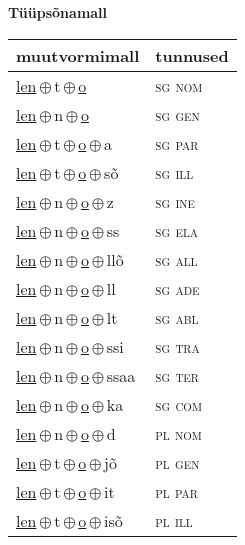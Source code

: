 

\vspace{3.5em}
\noindent \begin{minipage}{\textwidth}
\noindent \textbf{Tüüpsõnamall \,}\\

\begin{sideways}
\begin{tabular}{l l}
muutvormimall & tunnused \\
\hline
\underline{len}\,$\oplus$\,t\,$\oplus$\,\underline{o} & \textsc{ sg nom } \\
\underline{len}\,$\oplus$\,n\,$\oplus$\,\underline{o} & \textsc{ sg gen } \\
\underline{len}\,$\oplus$\,t\,$\oplus$\,\underline{o}\,$\oplus$\,a & \textsc{ sg par } \\
\underline{len}\,$\oplus$\,t\,$\oplus$\,\underline{o}\,$\oplus$\,sõ & \textsc{ sg ill } \\
\underline{len}\,$\oplus$\,n\,$\oplus$\,\underline{o}\,$\oplus$\,z & \textsc{ sg ine } \\
\underline{len}\,$\oplus$\,n\,$\oplus$\,\underline{o}\,$\oplus$\,ss & \textsc{ sg ela } \\
\underline{len}\,$\oplus$\,n\,$\oplus$\,\underline{o}\,$\oplus$\,llõ & \textsc{ sg all } \\
\underline{len}\,$\oplus$\,n\,$\oplus$\,\underline{o}\,$\oplus$\,ll & \textsc{ sg ade } \\
\underline{len}\,$\oplus$\,n\,$\oplus$\,\underline{o}\,$\oplus$\,lt & \textsc{ sg abl } \\
\underline{len}\,$\oplus$\,n\,$\oplus$\,\underline{o}\,$\oplus$\,ssi & \textsc{ sg tra } \\
\underline{len}\,$\oplus$\,n\,$\oplus$\,\underline{o}\,$\oplus$\,ssaa & \textsc{ sg ter } \\
\underline{len}\,$\oplus$\,n\,$\oplus$\,\underline{o}\,$\oplus$\,ka & \textsc{ sg com } \\
\underline{len}\,$\oplus$\,n\,$\oplus$\,\underline{o}\,$\oplus$\,d & \textsc{ pl nom } \\
\underline{len}\,$\oplus$\,t\,$\oplus$\,\underline{o}\,$\oplus$\,jõ & \textsc{ pl gen } \\
\underline{len}\,$\oplus$\,t\,$\oplus$\,\underline{o}\,$\oplus$\,it & \textsc{ pl par } \\
\underline{len}\,$\oplus$\,t\,$\oplus$\,\underline{o}\,$\oplus$\,isõ & \textsc{ pl ill } \\

\end{tabular}
\end{sideways}
\end{minipage}

